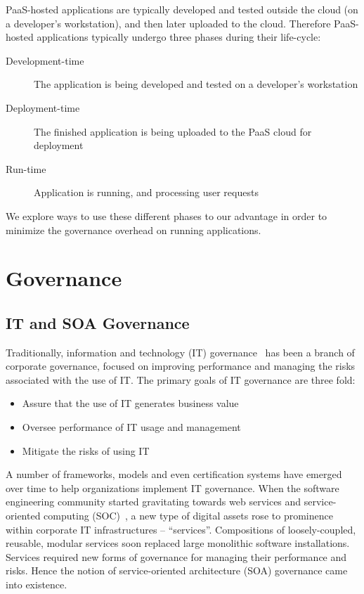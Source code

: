 PaaS-hosted applications are typically developed and tested outside the cloud (on a developer's workstation), 
and then later uploaded to the cloud. Therefore PaaS-hosted applications typically undergo three phases 
during their life-cycle:
\begin{description}
\item[Development-time] The application is being developed and tested on a developer's workstation
\item[Deployment-time] The finished application is being uploaded to the PaaS cloud for deployment
\item[Run-time] Application is running, and processing user requests
\end{description}
We explore ways to use these different phases to our advantage in order to minimize the governance
overhead on running applications. 

\section{Governance}
\subsection{IT and SOA Governance}
Traditionally, information and technology (IT) governance~\cite{brown2005framing} has been a branch of 
corporate governance, focused on
improving performance and managing the risks associated with the use of IT. The primary
goals of IT governance are three fold:

\begin{itemize}
\item Assure that the use of IT generates business value
\item Oversee performance of IT usage and management
\item Mitigate the risks of using IT
\end{itemize}

A number of frameworks, models and even certification systems have emerged over time to help organizations 
implement IT governance. When the software engineering community started gravitating towards web services and
service-oriented computing (SOC)~\cite{1254461, what-is-soa}, a new type of digital assets rose to prominence within corporate IT 
infrastructures -- ``services''. Compositions of loosely-coupled, reusable, modular services soon replaced 
large monolithic software
installations. Services required new forms of governance for managing their performance
and risks. Hence the notion of service-oriented architecture (SOA) governance came into existence. 

